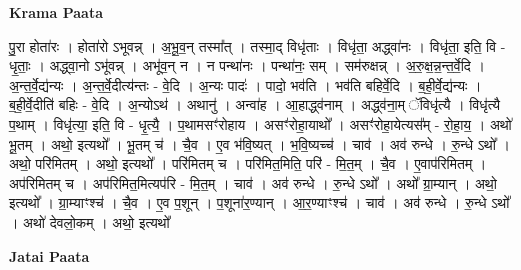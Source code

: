 \documentclass[17pt]{extarticle}
\begin{document}
\textbf{Krama Paata} \newline

पु॒रा होता॑रः । होता॑रो ऽभूवन्न् । अ॒भू॒व॒न् तस्मा᳚त् । तस्मा॒द् विधृ॑ताः । विधृ॑ता॒ अद्ध्वा॑नः । विधृ॑ता॒ इति॒ वि - धृ॒ताः॒ । अद्ध्वा॒नो ऽभू॑वन्न् । अभू॑व॒न् न । न पन्था॑नः । पन्था॑नः॒ सम् । सम॑रुक्षन्न् । अ॒रु॒क्ष॒न्न॒न्त॒र्वे॒दि । अ॒न्त॒र्वे॒द्य॑न्यः । अ॒न्त॒र्वे॒दीत्य॑न्तः - वे॒दि । अ॒न्यः पादः॑ । पादो॒ भव॑ति । भव॑ति बहिर्वे॒दि । ब॒ही॒र्वे॒द्य॑न्यः । ब॒ही॒र्वे॒दीति॑ बहिः - वे॒दि । अ॒न्योऽथ॑ । अथानु॑ । अन्वा॑ह । आ॒हाद्ध्व॑नाम् । अद्ध्व॑ना॒म् ॅविधृ॑त्यै । विधृ॑त्यै प॒थाम् । विधृ॑त्या॒ इति॒ वि - धृ॒त्यै॒ । प॒थामसꣳ॑रोहाय । असꣳ॑रोहा॒याथो᳚ । असꣳ॑रोहा॒येत्यस᳚म् - रो॒हा॒य॒ । अथो॑ भू॒तम् । अथो॒ इत्यथो᳚ । भू॒तम् च॑ । चै॒व । ए॒व भ॑वि॒ष्यत् । भ॒वि॒ष्यच्च॑ । चाव॑ । अव॑ रुन्धे । रु॒न्धे ऽथो᳚ । अथो॒ परि॑मितम् । अथो॒ इत्यथो᳚ । परि॑मितम् च । परि॑मित॒मिति॒ परि॑ - मि॒त॒म् । चै॒व । ए॒वाप॑रिमितम् । अप॑रिमितम् च । अप॑रिमित॒मित्यप॑रि - मि॒त॒म् । चाव॑ । अव॑ रुन्धे । रु॒न्धे ऽथो᳚ । अथो᳚ ग्रा॒म्यान् । अथो॒ इत्यथो᳚ । ग्रा॒म्याꣳश्च॑ । चै॒व । ए॒व प॒शून् । प॒शूना॑र॒ण्यान् । आ॒र॒ण्याꣳश्च॑ । चाव॑ । अव॑ रुन्धे । रु॒न्धे ऽथो᳚ । अथो॑ देवलो॒कम् । अथो॒ इत्यथो᳚ \newline

\textbf{Jatai Paata} \newline
\end{document}
